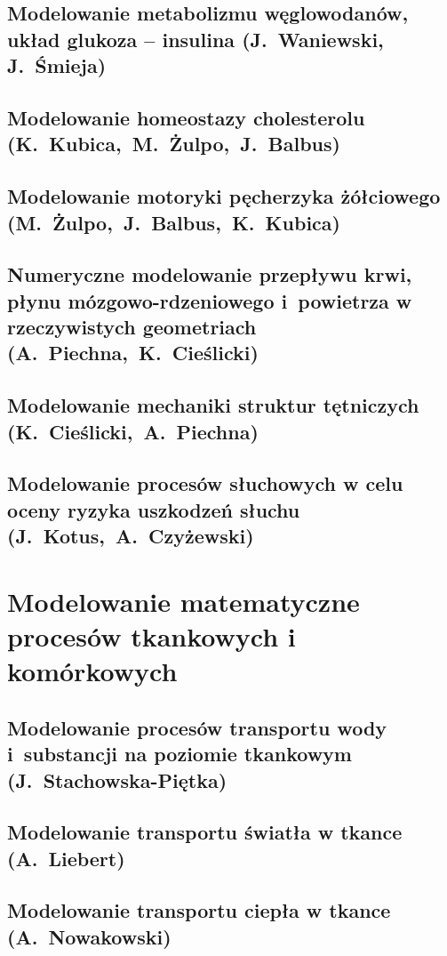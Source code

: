 \documentclass[11pt,a4paper,twoside,openright,draft]{memoir}
\begin{document}
			\chapter{Modelowanie metabolizmu węglowodanów, układ glukoza – insulina (J.~Waniewski, J.~Śmieja)}
			\chapter{Modelowanie homeostazy cholesterolu (K.~Kubica,~M.~Żulpo,~J.~Balbus)}
			\chapter{Modelowanie motoryki pęcherzyka żółciowego (M.~Żulpo,~J.~Balbus,~K.~Kubica)}
			\chapter{Numeryczne modelowanie przepływu krwi, płynu mózgowo-rdzeniowego i~powietrza w rzeczywistych geometriach (A.~Piechna,~K.~Cieślicki)}
			\chapter{Modelowanie mechaniki struktur tętniczych (K.~Cieślicki,~A.~Piechna)}
			\chapter{Modelowanie procesów słuchowych w celu oceny ryzyka uszkodzeń słuchu (J.~Kotus,~A.~Czyżewski)}
			
			
		\part{Modelowanie matematyczne procesów tkankowych i komórkowych}
		
			\chapter{Modelowanie procesów transportu wody i~substancji na poziomie tkankowym (J.~Stachowska-Piętka)}
			\chapter{Modelowanie transportu światła w tkance (A.~Liebert)}
			\chapter{Modelowanie transportu ciepła w tkance (A.~Nowakowski)}
\end{document}
